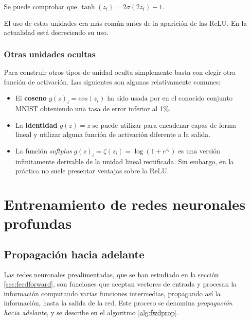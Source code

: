 Se puede comprobar que \(\tanh(z_i)=2\sigma(2z_i)-1\).

El uso de estas unidades era más común antes de la aparición de las
ReLU. En la actualidad está decreciendo su uso.

\subsubsection{Otras unidades ocultas}\label{otras-unidades-ocultas}

Para construir otros tipos de unidad oculta simplemente basta con elegir
otra función de activación. Las siguientes son algunas relativamente
comunes:

\begin{itemize}
\tightlist
\item
  El \textbf{coseno} \(g(z)_i=cos(z_i)\) ha sido usada por
  \textcite{goodfellow2016} en el conocido conjunto MNIST obteniendo una
  tasa de error inferior al 1\%.
\item
  La \textbf{identidad} \(g(z) = z\) se puede utilizar para encadenar
  capas de forma lineal y utilizar alguna función de activación
  diferente a la salida.
\item
  La función \emph{softplus} \(g(z)_i=\zeta(z_i)=\log(1+e^{z_i})\) es
  una versión infinitamente derivable de la unidad lineal rectificada.
  Sin embargo, en la práctica no suele presentar ventajas sobre la ReLU.
\end{itemize}

\section{Entrenamiento de redes neuronales
profundas}\label{entrenamiento-de-redes-neuronales-profundas}

\subsection{Propagación hacia
adelante}\label{propagaciuxf3n-hacia-adelante}

Las redes neuronales prealimentadas, que se han estudiado en la sección
\ref{sec:feedforward}, son funciones que aceptan vectores de entrada y
procesan la información computando varias funciones intermedias,
propagando así la información, hasta la salida de la red. Este proceso
se denomina \emph{propagación hacia adelante}, y se describe en el
algoritmo \ref{alg:fwdprop}.

